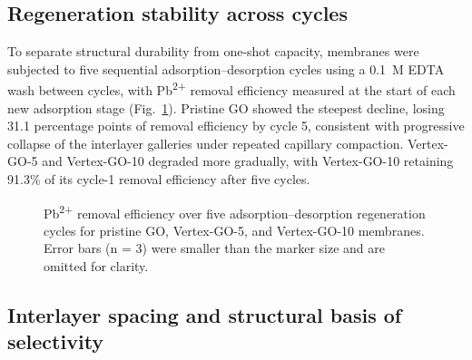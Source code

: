 \subsection{Regeneration stability across cycles}

To separate structural durability from one-shot capacity, membranes were subjected to five sequential adsorption--desorption cycles using a 0.1~M EDTA wash between cycles, with Pb\textsuperscript{2+} removal efficiency measured at the start of each new adsorption stage (Fig.~\ref{fig:cycling}). Pristine GO showed the steepest decline, losing 31.1 percentage points of removal efficiency by cycle 5, consistent with progressive collapse of the interlayer galleries under repeated capillary compaction. Vertex-GO-5 and Vertex-GO-10 degraded more gradually, with Vertex-GO-10 retaining 91.3\% of its cycle-1 removal efficiency after five cycles.

\begin{figure}[htbp]
\centering
{}
\caption{Pb\textsuperscript{2+} removal efficiency over five adsorption--desorption regeneration cycles for pristine GO, Vertex-GO-5, and Vertex-GO-10 membranes. Error bars (n = 3) were smaller than the marker size and are omitted for clarity.}
\label{fig:cycling}
\end{figure}

\subsection{Interlayer spacing and structural basis of selectivity}

